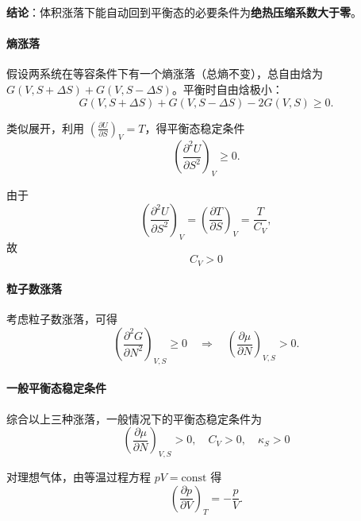 \documentclass[UTF8]{ctexart}
\theoremstyle{definition}
\begin{document}
\textbf{结论}：体积涨落下能自动回到平衡态的必要条件为\textbf{绝热压缩系数大于零}。

\paragraph{熵涨落}

假设两系统在等容条件下有一个熵涨落（总熵不变），总自由焓为 $G(V,S+\Delta S)+G(V,S-\Delta S)$。平衡时自由焓极小：
\begin{equation}
G(V,S+\Delta S) + G(V,S-\Delta S) - 2G(V,S) \ge 0.
\end{equation}

类似展开，利用 $\displaystyle\left(\frac{\partial U}{\partial S}\right)_V=T$，得平衡态稳定条件
\begin{equation}
\left(\frac{\partial^2 U}{\partial S^2}\right)_V \ge 0.
\end{equation}

由于
\begin{equation}
\left(\frac{\partial^2 U}{\partial S^2}\right)_V = \left(\frac{\partial T}{\partial S}\right)_V
= \frac{T}{C_V},
\end{equation}
故
\begin{equation}
\boxed{C_V > 0}
\end{equation}

\paragraph{粒子数涨落}

考虑粒子数涨落，可得
\begin{equation}
\left(\frac{\partial^2 G}{\partial N^2}\right)_{V,S} \ge 0
\quad\Rightarrow\quad
\left(\frac{\partial\mu}{\partial N}\right)_{V,S} > 0.
\end{equation}

\paragraph{一般平衡态稳定条件}

综合以上三种涨落，一般情况下的平衡态稳定条件为
\begin{equation}
\boxed{\left(\frac{\partial\mu}{\partial N}\right)_{V,S} > 0,\quad C_V > 0,\quad \kappa_S > 0}
\end{equation}

对理想气体，由等温过程方程 $pV=\text{const}$ 得
\begin{equation}
\left(\frac{\partial p}{\partial V}\right)_T = -\frac{p}{V}.
\end{equation}
\end{document}
